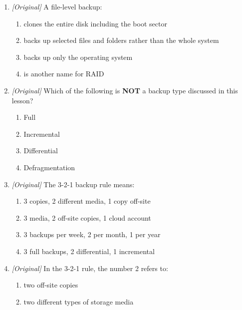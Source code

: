 \documentclass[11pt]{article}
\begin{document}
\begin{enumerate}[label=\textbf{Q\arabic*.}, leftmargin=*]
  as:
  \begin{enumerate}[label=\Alph*.]
    \item a copy of only the documents folder
    \item a complete clone of a system, including the OS, settings and data
    \item a copy of changes since the last full backup
    \item a copy of only the most recently deleted files
  \end{enumerate}
\item \textit{[Original]} A file-level backup:
  \begin{enumerate}[label=\Alph*.]
    \item clones the entire disk including the boot sector
    \item backs up selected files and folders rather than the whole system
    \item backs up only the operating system
    \item is another name for RAID
  \end{enumerate}
\item \textit{[Original]} Which of the following is \textbf{NOT} a backup
  type discussed in this lesson?
  \begin{enumerate}[label=\Alph*.]
    \item Full
    \item Incremental
    \item Differential
    \item Defragmentation
  \end{enumerate}
\item \textit{[Original]} The 3-2-1 backup rule means:
  \begin{enumerate}[label=\Alph*.]
    \item 3 copies, 2 different media, 1 copy off-site
    \item 3 media, 2 off-site copies, 1 cloud account
    \item 3 backups per week, 2 per month, 1 per year
    \item 3 full backups, 2 differential, 1 incremental
  \end{enumerate}
\item \textit{[Original]} In the 3-2-1 rule, the number 2 refers to:
  \begin{enumerate}[label=\Alph*.]
    \item two off-site copies
    \item two different types of storage media

\end{enumerate}
\end{enumerate}
\end{document}
